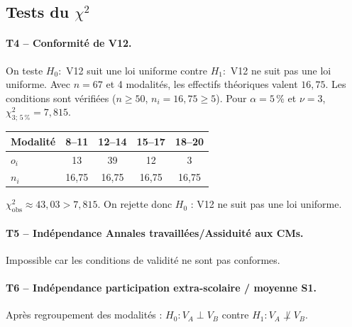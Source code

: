 
\subsection{Tests du $\chi^2$}

\paragraph{T4 -- Conformité de V12.}
On teste
$H_0:$ V12 suit une loi uniforme contre $H_1:$ V12 ne suit pas une loi uniforme.
Avec $n=67$ et 4 modalités, les effectifs théoriques valent $16{,}75$.
Les conditions sont vérifiées ($n\ge 50$, $n_i=16{,}75\ge5$).
Pour $\alpha=5\,\%$ et $\nu=3$, $\chi^2_{3;\,5\,\%}=7{,}815$.

\begin{center}\small
	\begin{tabular}{lcccc}
		\toprule
		Modalité & 8--11 & 12--14 & 15--17 & 18--20\\
		\midrule
		$o_i$ & 13 & 39 & 12 & 3\\
		$n_i$ & 16{,}75 & 16{,}75 & 16{,}75 & 16{,}75\\
		\bottomrule
	\end{tabular}
\end{center}

$\chi^2_{\mathrm{obs}}\approx43{,}03>7{,}815$.
On rejette donc $H_0$ : V12 ne suit pas une loi uniforme.

\paragraph{T5 -- Indépendance Annales travaillées/Assiduité aux CMs.}
Impossible car les conditions de validité ne sont pas conformes.

\paragraph{T6 -- Indépendance participation extra-scolaire / moyenne S1.}

Après regroupement des modalités :
$H_0 : V_A \perp V_B$ contre $H_1 : V_A \not\perp V_B$.

